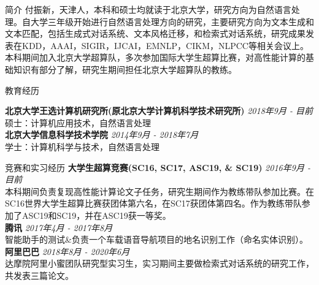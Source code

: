 \documentclass{resume} %
\begin{document}

\begin{rSection}{简介}
    付振新，天津人，本科和硕士均就读于北京大学，研究方向为自然语言处理。自大学三年级开始进行自然语言处理方向的研究，主要研究方向为文本生成和文本匹配，包括生成式对话系统、文本风格迁移，和检索式对话系统，研究成果发表在KDD，AAAI，SIGIR，IJCAI，EMNLP，CIKM，NLPCC等相关会议上。
    本科期间加入北京大学超算队，多次参加国际大学生超算比赛，对高性能计算的基础知识有部分了解，研究生期间担任北京大学超算队的教练。
\end{rSection}

\begin{rSection}{教育经历}

    {\bf 北京大学王选计算机研究所(原北京大学计算机科学技术研究所)} \hfill {\em 2018年9月 - 目前} 
    \\ 硕士：计算机应用技术，自然语言处理 \\
    {\bf 北京大学信息科学技术学院} \hfill {\em 2014年9月 - 2018年7月}
    \\ 学士：计算机科学与技术，自然语言处理
\end{rSection}

\begin{rSection}{竞赛和实习经历}
    \textbf{大学生超算竞赛(SC16, SC17, ASC19, \& SC19)} \hfill {\em 2016年9月 - 目前}\\
    本科期间负责复现高性能计算论文子任务，研究生期间作为教练带队参加比赛。在SC16世界大学生超算比赛获团体第六名，在SC17获团体第四名。作为教练带队参加了ASC19和SC19，并在ASC19获一等奖。 \\
    \textbf{腾讯} \hfill {\em 2017年4月 - 2017年8月} \\
    智能助手的测试\&负责一个车载语音导航项目的地名识别工作（命名实体识别）。\\
    \textbf{阿里巴巴} \hfill {\em 2018年8月 - 2020年6月}\\
    达摩院阿里小蜜团队研究型实习生，实习期间主要做检索式对话系统的研究工作，共发表三篇论文。
\end{rSection}
\end{document}
